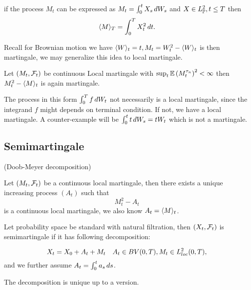 \begin{thm}
if the process $M_t$ can be expressed as $M_t = \int_0^t X_s \mathop{}\!d W_s$ and $X\in L_{\mathbb{P}}^{2}, t\leq T$ then 
\begin{equation*}
    \langle{M} \rangle_{T} = \int_0^T X_t^2 \mathop{}\!d t.
\end{equation*}
\end{thm}

Recall for Brownian motion we have $\langle{W} \rangle_{t} = t, M_t =  W_t^2 - \langle{W} \rangle_{t}$ is then martingale, we may generalize this idea to local martingale.

\begin{thm}
Let $(M_t, \mathcal{F}_t)$ be continuous Local martingale with $\sup_t \mathbb{E}\left(M_t^{\tau_n}\right)^2<\infty$ then $M_t^2 - \langle{M} \rangle_{t}$ is again martingale.
\end{thm}

\begin{rem}
The process in this form $\int_0^T f \mathop{}\!d W_t$ not necessarily is a local martingale, since the integrand $f$ might depends on terminal condition. If not, we have a local martingale. A counter-example will be $\int_0^t t \mathop{}\!d W_s = t W_t$ which is not a martingale.
\end{rem}

\subsection{Semimartingale}
\begin{thm}{(Doob-Meyer decomposition)}

Let $(M_t, \mathcal{F}_t)$ be a continuous local martingale, then there exists a unique increasing process $(A_t)$ such that \begin{equation*}
    M_t^2 - A_t
\end{equation*} is a continuous local martingale, we also know $A_t = \langle{M} \rangle_{t}$.
\end{thm}

\begin{dfn}
Let probability space be standard with natural filtration, then $(X_t, \mathcal{F}_t)$ is semimartingale if it has following decomposition:

\begin{equation*}
    X_t = X_0 + A_t + M_t \quad A_t \in BV(0,T), M_t \in L_{loc}^2(0,T),
\end{equation*} and we further assume $A_t = \int_0^t a_s \mathop{}\!d s$.
\end{dfn}

\begin{lem}
The decomposition is unique up to a version.
\end{lem}

